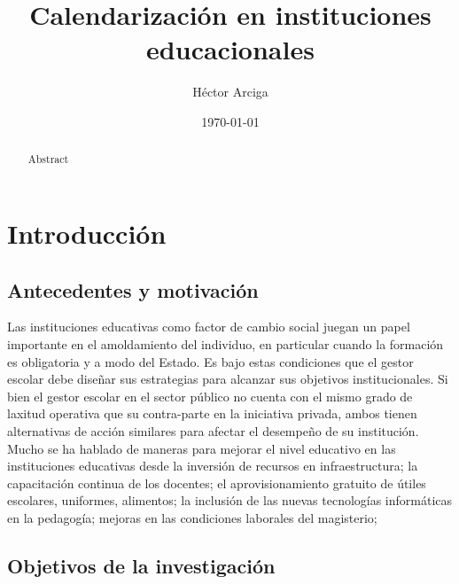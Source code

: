 \documentclass[draft,12pt,headsepline,footsepline,paper=letter]{scrreprt}
\begin{document}
\title{Calendarización en instituciones educacionales}
\author{Héctor Arciga}
\date{\today}

\maketitle

\begin{abstract}
Abstract
\end{abstract}

\begin{spacing}{1}
\tableofcontents
\glsaddall
\printglossaries
\listoffigures
\listoftables
\end{spacing}

\chapter{Introducción}

\section{Antecedentes y motivación}

Las instituciones educativas como factor de cambio social juegan un papel importante en el amoldamiento del individuo, en particular cuando la formación es obligatoria y a modo del Estado. Es bajo estas condiciones que el gestor escolar debe diseñar sus estrategias para alcanzar sus objetivos institucionales.
Si bien el gestor escolar en el sector público no cuenta con el mismo grado de laxitud operativa que su contra-parte en la iniciativa privada, ambos tienen alternativas de acción similares para afectar el desempeño de su institución.
Mucho se ha hablado de maneras para mejorar el nivel educativo en las instituciones educativas desde la inversión de recursos en infraestructura; la capacitación continua de los docentes; el aprovisionamiento gratuito de útiles escolares, uniformes, alimentos; la  inclusión de las nuevas tecnologías informáticas en la pedagogía; mejoras en las condiciones laborales del magisterio;

\section{Objetivos de la investigación}
\end{document}
